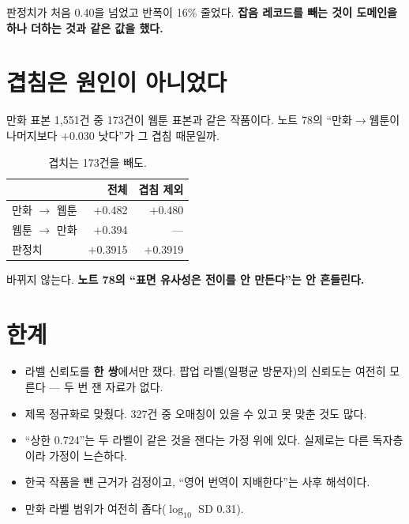 \documentclass[10pt]{article}
\begin{document}
판정치가 처음 0.40을 넘었고 반폭이 16\% 줄었다. \textbf{잡음 레코드를 빼는
것이 도메인을 하나 더하는 것과 같은 값을 했다.}


\section{겹침은 원인이 아니었다}

만화 표본 1,551건 중 173건이 웹툰 표본과 같은 작품이다. 노트 78의
``만화$\to$웹툰이 나머지보다 $+$0.030 낫다''가 그 겹침 때문일까.

\begin{table}[t]
\centering\tsize
\caption{겹치는 173건을 빼도.}
\begin{tabular}{lrr}
\toprule
& 전체 & 겹침 제외 \\
\midrule
만화 $\to$ 웹툰 & $+$0.482 & $+$0.480 \\
웹툰 $\to$ 만화 & $+$0.394 & --- \\
판정치 & $+$0.3915 & $+$0.3919 \\
\bottomrule
\end{tabular}
\end{table}

바뀌지 않는다. \textbf{노트 78의 ``표면 유사성은 전이를 안 만든다''는 안
흔들린다.}

\section{한계}

\begin{itemize}[leftmargin=1.1em,itemsep=0.15em]
\item 라벨 신뢰도를 \textbf{한 쌍}에서만 쟀다. 팝업 라벨(일평균 방문자)의
      신뢰도는 여전히 모른다 --- 두 번 잰 자료가 없다.
\item 제목 정규화로 맞췄다. 327건 중 오매칭이 있을 수 있고 못 맞춘 것도 많다.
\item ``상한 0.724''는 두 라벨이 같은 것을 잰다는 가정 위에 있다. 실제로는
      다른 독자층이라 가정이 느슨하다.
\item 한국 작품을 뺀 근거가 검정이고, ``영어 번역이 지배한다''는 사후 해석이다.
\item 만화 라벨 범위가 여전히 좁다($\log_{10}$ SD 0.31).
\end{itemize}
\end{document}
